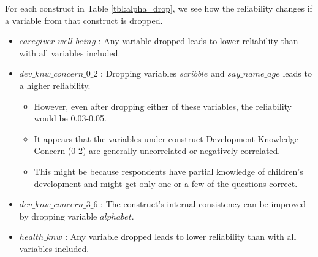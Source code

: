 \documentclass{article}
\begin{document}
For each construct in Table \ref{tbl:alpha_drop}, we see how the reliability changes if a variable from that construct is dropped.
\begin{itemize}
    \item $caregiver\_well\_being$ : Any variable dropped leads to lower reliability than with all variables included.
    \item $dev\_knw\_concern\_0\_2$ : Dropping variables $scribble$ and $say\_name\_age$ leads to a higher reliability. 
    \begin{itemize}
        \item However, even after dropping either of these variables, the reliability would be 0.03-0.05.
        \item It appears that the variables under construct Development Knowledge Concern (0-2) are generally uncorrelated or negatively correlated.
        \item This might be because respondents have partial knowledge of children's development and might get only one or a few of the questions correct.
    \end{itemize} 
    
 
    \item $dev\_knw\_concern\_3\_6$ : The construct's internal consistency can be improved by dropping variable $alphabet$.

    \item $health\_knw$ : Any variable dropped leads to lower reliability than with all variables included.
\end{itemize}

 
 


\end{document}
